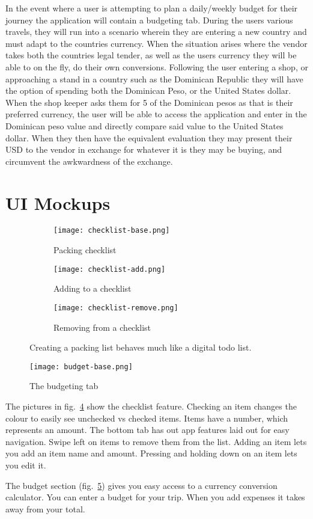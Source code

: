 \documentclass[12pt]{article}
\begin{document}
	In the event where a user is attempting to plan a daily/weekly budget for their journey the application will contain a budgeting tab.
	During the users various travels, they will run into a scenario wherein they are
	entering a new country and must adapt to the countries currency.
	When the situation arises where the vendor takes both the countries legal tender,
	as well as the users currency they will be able to on the fly, do their own conversions.
	Following the user entering a shop, or approaching a stand in a country such as the Dominican Republic
	they will have the option of spending both the Dominican Peso, or the United States dollar.
	When the shop keeper asks them for 5 of the Dominican pesos as that is their preferred currency,
	the user will be able to access the application and enter in the Dominican peso value and directly compare said value to the United States dollar.
	When they then have the equivalent evaluation they may present their USD to the vendor in exchange for whatever it is they may be buying,
	and circumvent the awkwardness of the exchange.

	\pagebreak

\section*{UI Mockups}

	\begin{figure}[!hb]
		\centering
		\begin{subfigure}{0.15\linewidth}
			\texttt{[image: checklist-base.png]}
			\caption{Packing checklist}
			\label{fig:checklist-base}
		\end{subfigure}
		\begin{subfigure}{0.15\linewidth}
			\texttt{[image: checklist-add.png]}
			\caption{Adding to a checklist}
			\label{fig:checklist-add}
		\end{subfigure}
		\begin{subfigure}{0.15\linewidth}
			\texttt{[image: checklist-remove.png]}
			\caption{Removing from a checklist}
			\label{fig:checklist-remove}
		\end{subfigure}
		\caption{Creating a packing list behaves much like a digital todo list.}
		\label{fig:checklist}
	\end{figure}

	\begin{figure}
		\centering
		\texttt{[image: budget-base.png]}
		\caption{The budgeting tab}
		\label{fig:budget}
	\end{figure}

    The pictures in fig.~\ref{fig:checklist} show the checklist feature.
	Checking an item changes the colour to easily see unchecked vs checked items.
    Items have a number, which represents an amount.
    The bottom tab has out app features laid out for easy navigation.
    Swipe left on items to remove them from the list.
    Adding an item lets you add an item name and amount.
    Pressing and holding down on an item lets you edit it.

    The budget section (fig.~\ref{fig:budget}) gives you easy access to a currency conversion calculator.
    You can enter a budget for your trip.
    When you add expenses it takes away from your total.
\end{document}
